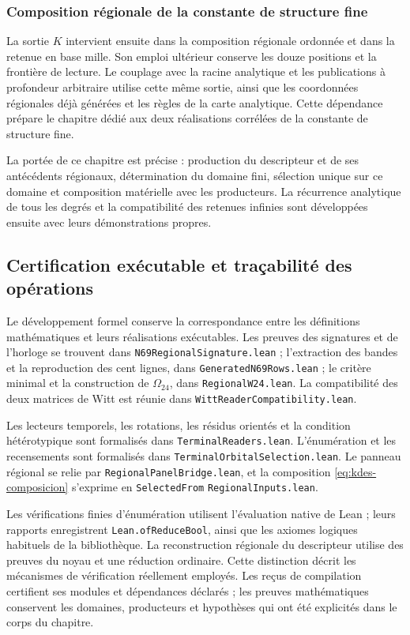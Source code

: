 \subsubsection{Composition régionale de la constante de structure fine}

La sortie $K$ intervient ensuite dans la composition régionale ordonnée et dans la retenue en base mille. Son emploi ultérieur conserve les douze positions et la frontière de lecture. Le couplage avec la racine analytique et les publications à profondeur arbitraire utilise cette même sortie, ainsi que les coordonnées régionales déjà générées et les règles de la carte analytique. Cette dépendance prépare le chapitre dédié aux deux réalisations corrélées de la constante de structure fine.

La portée de ce chapitre est précise : production du descripteur et de ses antécédents régionaux, détermination du domaine fini, sélection unique sur ce domaine et composition matérielle avec les producteurs. La récurrence analytique de tous les degrés et la compatibilité des retenues infinies sont développées ensuite avec leurs démonstrations propres.

\subsection{Certification exécutable et traçabilité des opérations}

Le développement formel conserve la correspondance entre les
définitions mathématiques et leurs réalisations exécutables. Les preuves
des signatures et de l'horloge se trouvent dans
\texttt{N69RegionalSignature.lean} ; l'extraction des bandes et la
reproduction des cent lignes, dans
\texttt{GeneratedN69Rows.lean} ; le critère minimal et la construction
de $\Omega_{24}$, dans \texttt{RegionalW24.lean}. La compatibilité des
deux matrices de Witt est réunie dans
\texttt{WittReaderCompatibility.lean}.

Les lecteurs temporels, les rotations, les résidus orientés et la
condition hétérotypique sont formalisés dans
\texttt{TerminalReaders.lean}. L'énumération et les recensements sont
formalisés dans \texttt{Terminal}\allowbreak\texttt{Orbital}\allowbreak\texttt{Selection.lean}. Le panneau
régional se relie par \texttt{Regional}\allowbreak\texttt{Panel}\allowbreak\texttt{Bridge.lean}, et la
composition \eqref{eq:kdes-composicion} s'exprime en
\texttt{Selected}\allowbreak\texttt{From}\allowbreak%
\texttt{Regional}\allowbreak\texttt{Inputs.lean}.

Les vérifications finies d'énumération utilisent l'évaluation native de Lean ; leurs rapports enregistrent \texttt{Lean.ofReduceBool}, ainsi que les axiomes logiques habituels de la bibliothèque. La reconstruction régionale du descripteur utilise des preuves du noyau et une réduction ordinaire. Cette distinction décrit les mécanismes de vérification réellement employés. Les reçus de compilation certifient ses modules et dépendances déclarés ; les preuves mathématiques conservent les domaines, producteurs et hypothèses qui ont été explicités dans le corps du chapitre.
